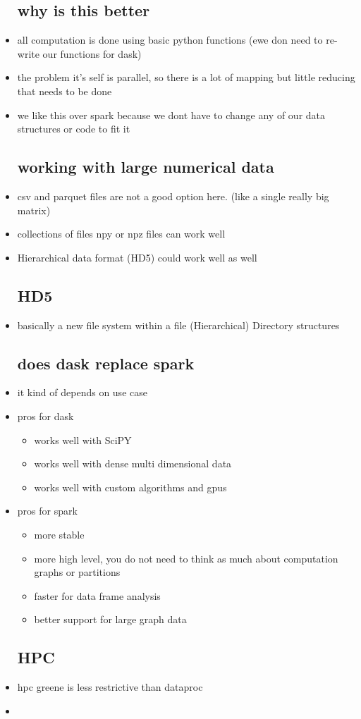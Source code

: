 \documentclass{article}
\begin{document}
\begin{itemize}
\subsection*{why is this better}
\item  all computation is done using basic python functions (ewe don need to re-write our functions for dask)
\item the problem it's self is parallel, so there is a lot of mapping but little reducing that needs to be done 
\item we like this over spark because we dont have to change any of our data structures or code to fit it 


\subsection*{working with large numerical data}
\item csv and parquet files are not a good option here. (like a single really big matrix)
\item collections of files npy or npz files can work well
\item Hierarchical data format (HD5) could work well as well 
\subsection*{HD5}
\item basically a new file system within a file (Hierarchical) Directory structures
\subsection*{does dask replace spark}
\item it kind of depends on use case 
\item pros for dask 
\begin{itemize}
    \item works well with SciPY
    \item works well with dense multi dimensional data 
    \item works well with custom algorithms and gpus
\end{itemize}
\item pros for spark
\begin{itemize}
    \item more stable 
    \item more high level, you do not need to think as much about computation graphs or partitions
    \item faster for data frame analysis
    \item better support for large graph data
\end{itemize}
\subsection*{HPC}
\item hpc greene is less restrictive than dataproc
\item 



\end{itemize}
\end{document}
